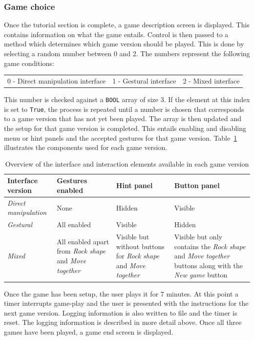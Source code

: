 \subsubsection{Game choice}
Once the tutorial section is complete, a game description screen is displayed. This contains information on what the game entails. Control is then passed to a method which determines which game version should be played. This is done by selecting a random number between 0 and 2. The numbers represent the following game conditions:
\begin{center}
\begin{tabular}{c c c}
  0 - Direct manipulation interface & 1 - Gestural interface & 2 - Mixed interface \\
\end{tabular} \end{center} 
This number is checked against a \texttt{BOOL} array of size 3. If the element at this index is set to \texttt{True}, the process is repeated until a number is chosen that corresponds to a game version that has not yet been played. The array is then updated and the setup for that game version is completed. This entails enabling and disabling menu or hint panels and the accepted gestures for that game version. Table~\ref{diffVer} illustrates the components used for each game version. 

\begin{table}

\centering
\begin{tabular}{l | p{3cm} | p{3cm} | p{3cm}}
\hline
 Interface version &  Gestures enabled &  Hint panel &  Button panel \\
\hline
\textit{Direct manipulation} & None & Hidden & Visible \\[2pt]
\hline
\textit{Gestural} & All enabled & Visible & Hidden \\[2pt]
\hline
\textit{Mixed} & All enabled apart from \emph{Rock shape} and \emph{Move together} & Visible but without buttons for \emph{Rock shape} and \emph{Move together} & Visible but only contains the \emph{Rock shape} and \emph{Move together} buttons along with the \emph{New game} button \\[2pt]
\hline
\end{tabular}
\caption{Overview of the interface and interaction elements available in each game version}
\label {diffVer}
\end{table}

Once the game has been setup, the user plays it for 7 minutes. At this point a timer interrupts game-play and the user is presented with the instructions for the next game version. Logging information is also written to file and the timer is reset. The logging information is described in more detail above. Once all three games have been played, a game end screen is displayed.



